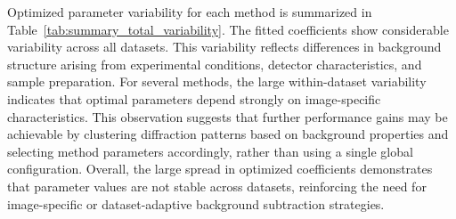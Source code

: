 \documentclass[iucr]{iucrjournals}
\begin{document}
Optimized parameter variability for each method is summarized in Table~\ref{tab:summary_total_variability}. The fitted coefficients show considerable variability across all datasets. This variability reflects differences in background structure arising from experimental conditions, detector characteristics, and sample preparation. For several methods, the large within-dataset variability indicates that optimal parameters depend strongly on image-specific characteristics. This observation suggests that further performance gains may be achievable by clustering diffraction patterns based on background properties and selecting method parameters accordingly, rather than using a single global configuration. Overall, the large spread in optimized coefficients demonstrates that parameter values are not stable across datasets, reinforcing the need for image-specific or dataset-adaptive background subtraction strategies.

\end{document}
